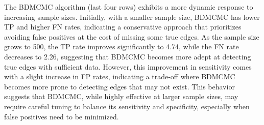 \documentclass{report}
\begin{document}
The BDMCMC algorithm (last four rows) exhibits a more dynamic response to increasing sample sizes. Initially, with a smaller sample size, BDMCMC has lower TP and higher FN rates, indicating a conservative approach that prioritizes avoiding false positives at the cost of missing some true edges. As the sample size grows to 500, the TP rate improves significantly to 4.74, while the FN rate decreases to 2.26, suggesting that BDMCMC becomes more adept at detecting true edges with sufficient data. However, this improvement in sensitivity comes with a slight increase in FP rates, indicating a trade-off where BDMCMC becomes more prone to detecting edges that may not exist. This behavior suggests that BDMCMC, while highly effective at larger sample sizes, may require careful tuning to balance its sensitivity and specificity, especially when false positives need to be minimized.
\end{document}
